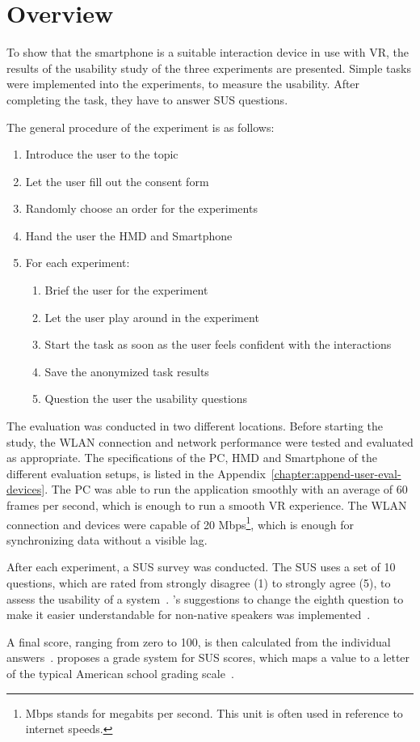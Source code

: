 \section{Overview}\label{section:evaluation-overview}

To show that the smartphone is a suitable interaction device in use with \ac{VR}, the results of the usability study of the three experiments are presented. Simple tasks were implemented into the experiments, to measure the usability. After completing the task, they have to answer \ac{SUS} questions.

The general procedure of the experiment is as follows:
\begin{enumerate}
  \item Introduce the user to the topic
  \item Let the user fill out the consent form
  \item Randomly choose an order for the experiments
  \item Hand the user the \ac{HMD} and Smartphone
  \item For each experiment:
  \begin{enumerate}
  \item Brief the user for the experiment
  \item Let the user play around in the experiment
  \item Start the task as soon as the user feels confident with the interactions
  \item Save the anonymized task results
  \item Question the user the usability questions
  \end{enumerate}
\end{enumerate}

The evaluation was conducted in two different locations. Before starting the study, the \ac{WLAN} connection and network performance were tested and evaluated as appropriate. The specifications of the \ac{PC}, \ac{HMD} and Smartphone of the different evaluation setups, is listed in the Appendix~\ref{chapter:append-user-eval-devices}. The \ac{PC} was able to run the application smoothly with an average of 60 frames per second, which is enough to run a smooth \ac{VR} experience. The \ac{WLAN} connection and devices were capable of 20 Mbps\footnote{Mbps stands for megabits per second. This unit is often used in reference to internet speeds.}, which is enough for synchronizing data without a visible lag.

After each experiment, a \ac{SUS} survey was conducted. The \acf{SUS} uses a set of 10 questions, which are rated from strongly disagree (1) to strongly agree (5), to assess the usability of a system~\cite[3]{Brooke.1996}. \citeauthor{Finstad.2006}'s suggestions to change the eighth question to make it easier understandable for non-native speakers was implemented~\cite[188]{Finstad.2006}. 

A final score, ranging from zero to 100, is then calculated from the individual answers~\cite{Brooke.1996}. \citeauthor{Bangor.2009} proposes a grade system for \ac{SUS} scores, which maps a value to a letter of the typical American school grading scale~\cite{Bangor.2009}.